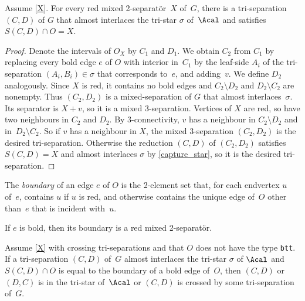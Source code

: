 \documentclass{aic}
\theoremstyle{plain}
\theoremstyle{definition}
\theoremstyle{plain}
\theoremstyle{plain}
\newcommand{\sm}{\setminus}
\newcommand{\ty}[1]{{\tt#1}}
\begin{document}
\begin{lem}\label{red_lift}
Assume \autoref{X}.
    For every red mixed 2-separat{\"o}r~$X$ of~$G$, there is a tri-separation $(C,D)$ of $G$ that almost interlaces the tri-star $\sigma$ of~$\Acal$ and satisfies $S(C,D)\cap O=X$.
\end{lem}

\begin{proof}
Denote the intervals of $O_X$ by $C_1$ and $D_1$.
We obtain $C_2$ from $C_1$ by replacing every bold edge $e$ of $O$ {with interior in~$C_1$} by the leaf-side $A_i$ of the tri-separation $(A_i,B_i)\in \sigma$ that corresponds to~$e$, and adding~$v$. 
We define $D_2$ analogously. 
Since $X$ is red, it contains no bold edges and $C_2\sm D_2$ and $D_2\sm C_2$ are nonempty. 
Thus $(C_2,D_2)$ is a mixed-separation of $G$ that almost interlaces~$\sigma$. 
Its separator is $X+v$, so it is a mixed 3-separation. Vertices of $X$ are red, so have two neighbours in $C_2$ and $D_2$. 
By 3-connectivity, $v$ has a neighbour in $C_2\sm D_2$ and in~$D_2\sm C_2$. 
So if $v$ has a neighbour in $X$, the mixed 3-separation $(C_2,D_2)$ is the desired tri-separation. 
Otherwise the reduction $(C,D)$ of $(C_2,D_2)$ satisfies $S(C,D)=X$ and almost interlaces $\sigma$ by \autoref{capture_star}, so it is the desired tri-separation. 
\end{proof}

The \emph{boundary} of an edge $e$ of $O$ is the 2-element set that, for each endvertex $u$ of~$e$, contains $u$ if $u$ is red, and otherwise contains the unique edge of~$O$ other than~$e$ that is incident with~$u$.

\begin{eg}\label{boundary_good}
    If $e$ is bold, then its boundary is a red mixed 2-separat{\"o}r.
\end{eg}

\begin{lem}\label{is_bold}
Assume \autoref{X} with crossing tri-separations and that $O$ does not have the type \ty{btt}.  
    If a tri-separation $(C,D)$ of~$G$ almost interlaces the tri-star $\sigma$ of $\Acal$ and $S(C,D)\cap O$ is equal to the boundary of a bold edge of~$O$, then $(C,D)$ or $(D,C)$ is in the tri-star of~$\Acal$ or $(C,D)$ is crossed by some tri-separation of~$G$.
\end{lem}
\end{document}

